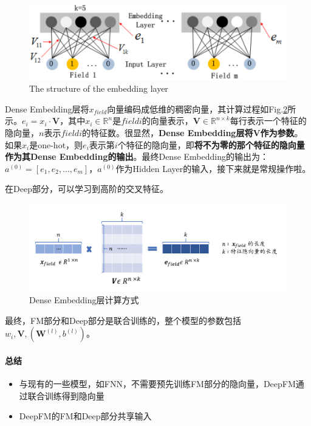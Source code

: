 \begin{figure}[h]
	\centering
	\includegraphics[width=.8\textwidth]{pics/deepfm-embedding.png}
	\caption{The structure of the embedding layer}
	\label{fig:deepfm-embedding}
\end{figure}
Dense Embedding层将$x_{field}$向量编码成低维的稠密向量，其计算过程如Fig.\ref{fig:embedding}所示。$e_{i} = x_i \cdot \boldsymbol{V}$，其中$x_i \in \mathbb{R}^n$是$field i$的向量表示，$\boldsymbol{V} \in \mathbb{R}^{n \times k}$每行表示一个特征的隐向量，$n$表示$field i$的特征数。很显然，\textbf{Dense Embedding层将$\boldsymbol{V}$作为参数}。如果$x_{i}$是one-hot，则$e_i$表示第$i$个特征的隐向量，即\textbf{将不为零的那个特征的隐向量作为其Dense Embedding的输出}。最终Dense Embedding的输出为：$a^{(0)} = [e_1, e_2, ..., e_m]$，$a^{(0)}$作为Hidden Layer的输入，接下来就是常规操作啦。

在Deep部分，可以学习到高阶的交叉特征。

\begin{figure}[h]
	\centering
	\includegraphics[width=.8\textwidth]{pics/embedding.pdf}
	\caption{Dense Embedding层计算方式}
	\label{fig:embedding}	
\end{figure}


最终，FM部分和Deep部分是联合训练的，整个模型的参数包括$w_i, \boldsymbol{V}, (\boldsymbol{W}^{(l)}, b^{(l)})$。

\paragraph{总结}

\begin{itemize}

	\item 与现有的一些模型，如FNN，不需要预先训练FM部分的隐向量，DeepFM通过联合训练得到隐向量
	\item DeepFM的FM和Deep部分共享输入
		

\end{itemize}

